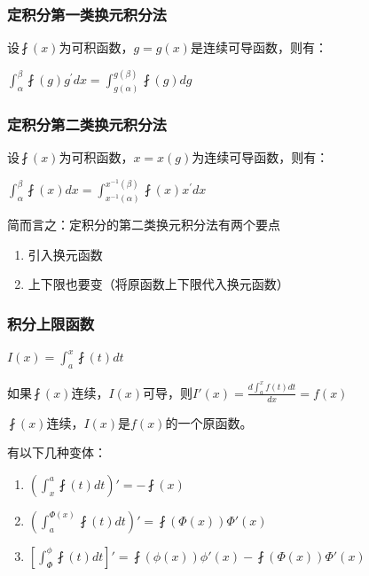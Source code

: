 \documentclass[UTF8]{ctexbook}
\newcommand{\derivative}{^\prime}
\newcommand{\defFunction}[1]{\fint(#1)}
\newcommand{\definiteIntegral}[2]{\int^{#1}_{#2}}
\begin{document}
{{{\subsubsection{定积分第一类换元积分法}{
  设$\defFunction{x}$为可积函数，$g = g(x)$是连续可导函数，则有：

  $\definiteIntegral{\beta}{\alpha} \defFunction{g}g\derivative dx = \definiteIntegral{g(\beta)}{g(\alpha)} \defFunction{g}dg$
}%

\subsubsection{定积分第二类换元积分法}{
  设$\defFunction{x}$为可积函数，$x = x(g)$为连续可导函数，则有：

  $\definiteIntegral{\beta}{\alpha} \defFunction{x}dx = \definiteIntegral{x^{-1}(\beta)}{x^{-1}(\alpha)}\defFunction{x}x\derivative dx$

  简而言之：定积分的第二类换元积分法有两个要点
  \begin{enumerate}
    \item 引入换元函数
    \item 上下限也要变（将原函数上下限代入换元函数）
  \end{enumerate}
}%

\subsubsection{积分上限函数}{
  $I(x) = \definiteIntegral{x}{a}\defFunction{t}dt$

  如果$\defFunction{x}连续$，$I(x)$可导，则$I\prime(x) = \frac{d\definiteIntegral{x}{a}f(t)dt}{dx} = f(x)$

  $\defFunction{x}$连续，$I(x)$是$f(x)$的一个原函数。

  有以下几种变体：

  \begin{enumerate}
    \item $(\definiteIntegral{a}{x}\defFunction{t}dt)\prime = -\defFunction{x}$
    \item $(\definiteIntegral{\Phi(x)}{a}\defFunction{t}dt)\prime = \defFunction{\Phi(x)}\Phi\prime(x)$
    \item $[\definiteIntegral{\phi}{\Phi}\defFunction{t}dt]\prime = \defFunction{\phi(x)}\phi\prime(x) - \defFunction{\Phi(x)}\Phi\prime(x)$
  \end{enumerate}

}%

}}}
\end{document}
